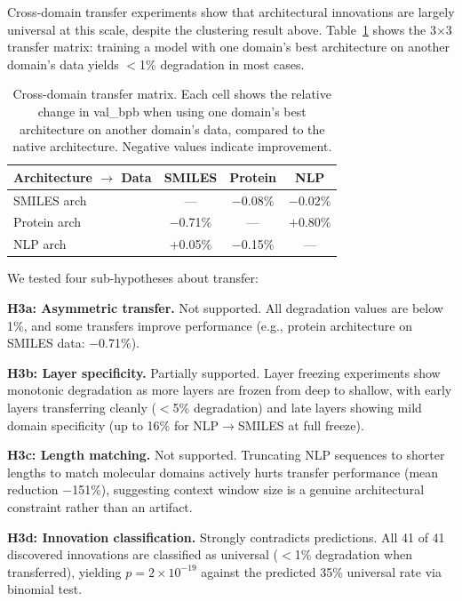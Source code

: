 Cross-domain transfer experiments show that architectural innovations are largely universal at this scale, despite the clustering result above. Table~\ref{tab:transfer} shows the 3$\times$3 transfer matrix: training a model with one domain's best architecture on another domain's data yields $<$1\% degradation in most cases.

\begin{table}[t]
\centering
\caption{Cross-domain transfer matrix. Each cell shows the relative change in val\_bpb when using one domain's best architecture on another domain's data, compared to the native architecture. Negative values indicate improvement.}
\label{tab:transfer}
\small
\begin{tabular}{@{}lccc@{}}
\toprule
\textbf{Architecture $\rightarrow$ Data} & \textbf{SMILES} & \textbf{Protein} & \textbf{NLP} \\
\midrule
SMILES arch & --- & $-$0.08\% & $-$0.02\% \\
Protein arch & $-$0.71\% & --- & $+$0.80\% \\
NLP arch & $+$0.05\% & $-$0.15\% & --- \\
\bottomrule
\end{tabular}
\end{table}

We tested four sub-hypotheses about transfer:

\textbf{H3a: Asymmetric transfer.} Not supported. All degradation values are below 1\%, and some transfers improve performance (e.g., protein architecture on SMILES data: $-$0.71\%).

\textbf{H3b: Layer specificity.} Partially supported. Layer freezing experiments show monotonic degradation as more layers are frozen from deep to shallow, with early layers transferring cleanly ($<$5\% degradation) and late layers showing mild domain specificity (up to 16\% for NLP$\to$SMILES at full freeze).

\textbf{H3c: Length matching.} Not supported. Truncating NLP sequences to shorter lengths to match molecular domains actively hurts transfer performance (mean reduction $-$151\%), suggesting context window size is a genuine architectural constraint rather than an artifact.

\textbf{H3d: Innovation classification.} Strongly contradicts predictions. All 41 of 41 discovered innovations are classified as universal ($<$1\% degradation when transferred), yielding $p = 2 \times 10^{-19}$ against the predicted 35\% universal rate via binomial test.

